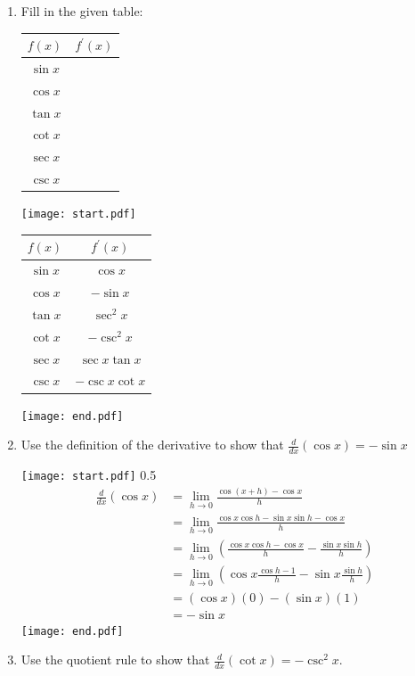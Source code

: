 \documentclass[12pt]{article}
\begin{document}
\begin{enumerate}

\item Fill in the given table:

\begin{center}
\begin{tabular}{c|c}
$f(x)$ & $f^{\prime}(x)$\\
\hline
$\sin{x}$ &  \\
\hline
$\cos{x}$ & \\
\hline
$\tan{x}$ & \\
\hline
$\cot{x}$ & \\
\hline
$\sec{x}$ & \\
\hline
$\csc{x}$ & 
\end{tabular}
\end{center}

\texttt{[image: start.pdf]}
{{
\begin{tabular}{c|c}
$f(x)$ & $f^{\prime}(x)$\\
\hline
$\sin{x}$ & $\cos{x}$  \\
\hline
$\cos{x}$ & $-\sin{x}$ \\
\hline
$\tan{x}$ & $\sec^2{x}$\\
\hline
$\cot{x}$ & $-\csc^2{x}$\\
\hline
$\sec{x}$ & $\sec{x}\tan{x}$\\
\hline
$\csc{x}$ & $-\csc{x}\cot{x}$ 
\end{tabular}
}}
\texttt{[image: end.pdf]}


\item Use the definition of the derivative to show that $\frac{d}{dx}(\cos{x})=-\sin{x}$

\texttt{[image: start.pdf]}
{{{0.5\linewidth}{
\begin{align*}
\frac{d}{dx}(\cos{x})&=\lim_{h \rightarrow 0}{\frac{\cos{(x+h)}-\cos{x}}{h}}\\
&=\lim_{h \rightarrow 0}{\frac{\cos{x}\cos{h}-\sin{x}\sin{h}-\cos{x}}{h}}\\
&=\lim_{h \rightarrow 0}{\left(\frac{\cos{x}\cos{h}-\cos{x}}{h}-\frac{\sin{x}\sin{h}}{h}\right)}\\
&=\lim_{h \rightarrow 0}{\left(\cos{x}\frac{\cos{h}-1}{h}-\sin{x}\frac{\sin{h}}{h}\right)}\\
&=(\cos{x})(0)-(\sin{x})(1)\\
&=-\sin{x}
\end{align*}
}}}
\texttt{[image: end.pdf]}

\item Use the quotient rule to show that $\frac{d}{dx}(\cot{x})=-\csc^2{x}$.


\end{enumerate}
\end{document}
